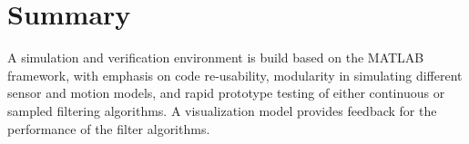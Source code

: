 \section{Summary}

A simulation and verification environment is build based on the MATLAB framework, with emphasis on code re-usability, modularity in simulating different sensor and motion models, and rapid prototype testing of either continuous or sampled filtering algorithms. A visualization model provides feedback for the performance of the filter algorithms.




